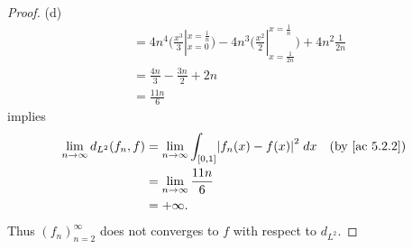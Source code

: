 \begin{proof}{(d)}
\begin{align*}
     & = 4n^4 \bigg(\frac{x^3}{3}|_{x = 0}^{x = \frac{1}{n}}\bigg) - 4n^3 \bigg(\frac{x^2}{2}|_{x = \frac{1}{2n}}^{x = \frac{1}{n}}\bigg) + 4n^2 \frac{1}{2n} \\
     & = \frac{4n}{3} - \frac{3n}{2} + 2n                                                                                                                     \\
     & = \frac{11n}{6}
  \end{align*}
  implies
  \begin{align*}
    \lim_{n \to \infty} d_{L^2}(f_n, f) & = \lim_{n \to \infty} \int_{[0, 1]} \abs{f_n(x) - f(x)}^2 \; dx & \text{(by \cref{ac 5.2.2})} \\
                                        & = \lim_{n \to \infty} \frac{11n}{6}                                                           \\
                                        & = +\infty.
  \end{align*}
  Thus \((f_n)_{n = 2}^\infty\) does not converges to \(f\) with respect to \(d_{L^2}\).
\end{proof}
